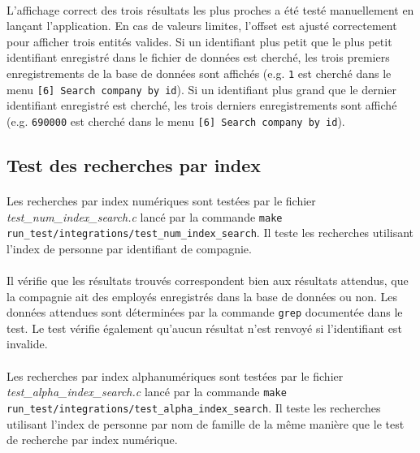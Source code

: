 \documentclass{article}
\begin{document}
    \paragraph{}
    L'affichage correct des trois résultats les plus proches a été testé manuellement en lançant l'application. En cas de valeurs limites, l'offset est ajusté correctement pour afficher trois entités valides. Si un identifiant plus petit que le plus petit identifiant enregistré dans le fichier de données est cherché, les trois premiers enregistrements de la base de données sont affichés (e.g. \texttt{1} est cherché dans le menu \texttt{[6] Search company by id}). Si un identifiant plus grand que le dernier identifiant enregistré est cherché, les trois derniers enregistrements sont affiché (e.g. \texttt{690000} est cherché dans le menu \texttt{[6] Search company by id}).


    \subsection{Test des recherches par index}
    \paragraph{}
    Les recherches par index numériques sont testées par le fichier \emph{test\_num\_index\_search.c} lancé par la commande \texttt{make run\_test/integrations/test\_num\_index\_search}. Il teste les recherches utilisant l'index de personne par identifiant de compagnie.

    \paragraph{}
    Il vérifie que les résultats trouvés correspondent bien aux résultats attendus, que la compagnie ait des employés enregistrés dans la base de données ou non. Les données attendues sont déterminées par la commande \texttt{grep} documentée dans le test. Le test vérifie également qu'aucun résultat n'est renvoyé si l'identifiant est invalide.

    \paragraph{}
    Les recherches par index alphanumériques sont testées par le fichier \emph{test\_alpha\_index\_search.c} lancé par la commande \texttt{make run\_test/integrations/test\_alpha\_index\_search}. Il teste les recherches utilisant l'index de personne par nom de famille de la même manière que le test de recherche par index numérique.
\end{document}
